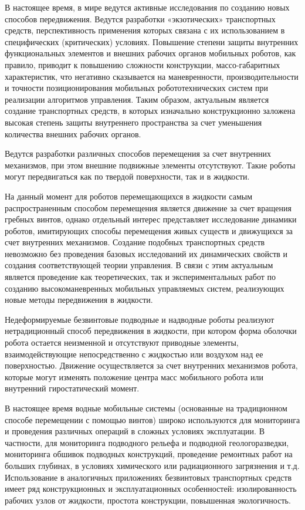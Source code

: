 
{\actuality} 

В настоящее время, в мире ведутся активные исследования по созданию новых способов передвижения. Ведутся разработки «экзотических» транспортных средств, перспективность применения которых связана с их использованием в специфических (критических) условиях. Повышение степени защиты внутренних функциональных элементов и внешних рабочих органов мобильных роботов, как правило, приводит к повышению сложности конструкции, массо-габаритных характеристик, что негативно сказывается на маневренности, производительности и точности позиционирования мобильных робототехнических систем при реализации алгоритмов управления. Таким образом, актуальным является создание транспортных средств, в которых изначально конструкционно заложена высокая степень защиты внутреннего пространства за счет уменьшения количества внешних рабочих органов. 

Ведутся разработки различных способов перемещения за счет внутренних механизмов, при этом внешние подвижные элементы отсутствуют. Такие роботы могут передвигаться как по твердой поверхности, так и в жидкости.

На данный момент для роботов перемещающихся в жидкости самым распространенным способом перемещения является движение за счет вращения гребных винтов, однако отдельный интерес представляет исследование динамики роботов, имитирующих способы перемещения живых существ и движущихся за счет внутренних механизмов. Создание подобных транспортных средств невозможно без проведения базовых исследований их динамических свойств и создания соответствующей теории управления. В связи с этим актуальным является проведение как теоретических, так и экспериментальных работ по созданию высокоманевренных мобильных управляемых систем, реализующих новые методы передвижения в жидкости.

Недеформируемые безвинтовые подводные и надводные роботы реализуют нетрадиционный способ передвижения в жидкости, при котором форма оболочки робота остается неизменной и отсутствуют приводные элементы, взаимодействующие непосредственно с жидкостью или воздухом над ее поверхностью. Движение осуществляется за счет внутренних механизмов робота, которые могут изменять положение центра масс мобильного робота или внутренний гиростатический момент. 

В настоящее время водные мобильные системы (основанные на традиционном способе перемещении с помощью винтов) широко используются для мониторинга и проведения различных операций в сложных условиях эксплуатации. В частности, для мониторинга подводного рельефа и подводной геологоразведки, мониторинга обшивок подводных конструкций, проведение ремонтных работ на больших глубинах, в условиях химического или радиационного загрязнения и т.д. Использование в аналогичных приложениях безвинтовых транспортных средств имеет ряд конструкционных и эксплуатационных особенностей: изолированность рабочих узлов от жидкости, простота конструкции, повышенная экологичность.

